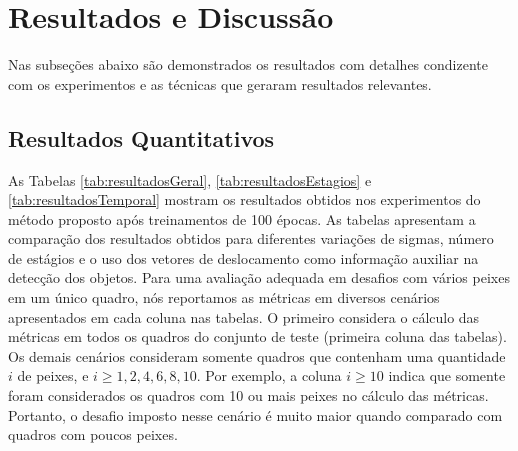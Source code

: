 \section{Resultados e Discussão}
\label{sec:resultados}


Nas subseções abaixo são demonstrados os resultados com detalhes condizente com os experimentos e as técnicas que geraram resultados relevantes.

\subsection{Resultados Quantitativos}
\label{subsec:ResultadosQ}
As Tabelas \ref{tab:resultadosGeral}, \ref{tab:resultadosEstagios} e \ref{tab:resultadosTemporal} mostram os resultados obtidos nos experimentos do método proposto após treinamentos de 100 épocas.
As tabelas apresentam a comparação dos resultados obtidos para diferentes variações de sigmas, número de estágios e o uso dos vetores de deslocamento como informação auxiliar na detecção dos objetos. 
Para uma avaliação adequada em desafios com vários peixes em um único quadro, nós reportamos as métricas em diversos cenários apresentados em cada coluna nas tabelas.
O primeiro considera o cálculo das métricas em todos os quadros do conjunto de teste (primeira coluna das tabelas).
Os demais cenários consideram somente quadros que contenham uma quantidade $i$ de peixes, e $i \geq {1,2,4,6,8,10}$.
Por exemplo, a coluna $i \geq 10$ indica que somente foram considerados os quadros com 10 ou mais peixes no cálculo das métricas.
Portanto, o desafio imposto nesse cenário é muito maior quando comparado com quadros com poucos peixes.


